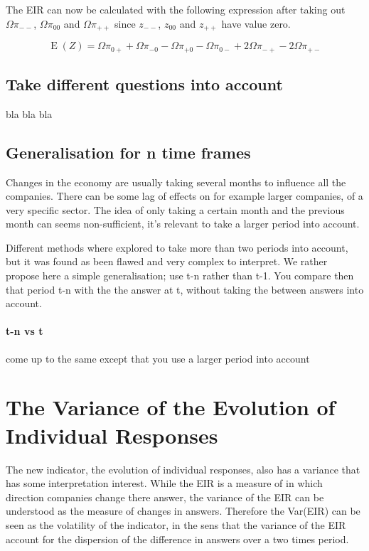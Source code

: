 \documentclass[12pt,a4paper,oneside]{book}
\DeclareMathOperator{\E}{E}
\begin{document}
The EIR can now be calculated with the following expression after taking out $\Omega \pi_{--}$, $\Omega \pi_{00}$ and $\Omega \pi_{++}$ since $z_{--}$, $z_{00}$ and $z_{++}$ have value zero.

\begin{equation}
    \E(Z) = \Omega \pi_{0+} + \Omega \pi_{-0} - \Omega \pi_{+0} - \Omega \pi_{0-} +2\Omega \pi_{-+} -2\Omega \pi_{+-} 
\end{equation}



\section{Take different questions into account}

bla bla bla

\section{Generalisation for n time frames}

Changes in the economy are usually taking several months to influence all the companies. There can be some lag of effects on for example larger companies, of a very specific sector.
The idea of only taking a certain month and the previous month can seems non-sufficient, it's relevant to take a larger period into account. 

Different methods where explored to take more than two periods into account, but it was found as been flawed and very complex to interpret.
We rather propose here a simple generalisation; use t-n rather than t-1. You compare then that period t-n with the the answer at t, without taking the between answers into account.

\subsubsection{t-n vs t}

come up to the same except that you use a larger period into account


\chapter{The Variance of the Evolution of Individual Responses} \label{Chapter:Var Z}

The new indicator, the evolution of individual responses, also has a variance that has some interpretation interest. 
While the EIR is a measure of in which direction companies change there answer, the variance of the EIR can be understood as the measure of changes in answers. Therefore the Var(EIR) can be seen as the volatility of the indicator, in the sens that the variance of the EIR account for the dispersion of the difference in answers over a two times period.
\end{document}
